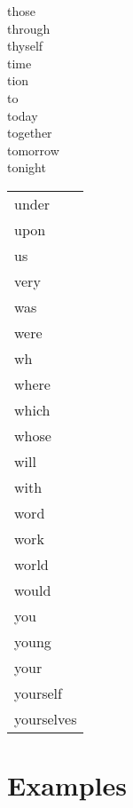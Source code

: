 \documentclass[draft]{article}
\makeatletter
\newcommand{\mytaglist}[1]{%
    \enskip\begin{tabular}[t]{@{}l@{}}
    #1
    \end{tabular}\enskip}
\makeatother
\begin{document}
\begin{center}
{those \\
through \\
thyself \\
time \\
tion \\
to \\
today \\
together \\
tomorrow \\
tonight \\
}
\mytaglist{
under \\
upon \\
us \\
very \\
was \\
were \\
wh \\
where \\
which \\
whose \\
will \\
with \\
word \\
work \\
world \\
would \\
you \\
young \\
your \\
yourself \\
yourselves \\
}
\end{center}


\section{Examples}
\end{document}
